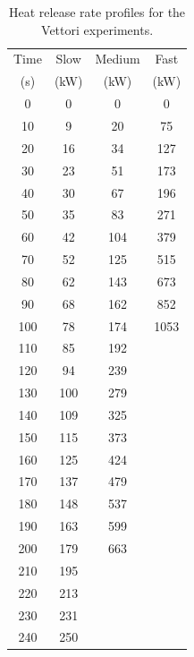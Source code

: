 \begin{table}[h!]
\caption[Heat release rate profiles for the Vettori experiments]{Heat release rate profiles for the Vettori experiments.}
\begin{center}
\begin{tabular}{|c|c|c|c|}
\hline
Time    & Slow     & Medium     & Fast   \\
(s)     & (kW)     & (kW)       & (kW)   \\  \hline \hline
0       & 0        & 0          & 0      \\ \hline 10		& 9        &  20        &  75    \\ \hline
20		& 16       &  34        &  127   \\ \hline
30		&   23     &  51        &  173   \\ \hline
40		&   30     &  67        &  196   \\ \hline
50		&   35     &  83        &  271   \\ \hline
60		&   42     &  104       &  379   \\ \hline
70		&   52     &  125       &  515   \\ \hline
80		&   62     &  143       &  673   \\ \hline
90		&   68     &  162       &  852   \\ \hline
100		&  78      &  174       & 1053   \\ \hline
110		&  85      &  192       &        \\ \hline
120		&  94      &  239       &        \\ \hline
130		&  100     &  279       &        \\ \hline
140		&  109     &  325       &        \\ \hline
150		&  115     &  373       &        \\ \hline
160		&  125     &  424       &        \\ \hline
170		&  137     &  479       &        \\ \hline
180		&  148     &  537       &        \\ \hline
190		&  163     &  599       &        \\ \hline
200		&  179     &  663       &        \\ \hline
210		&  195     &            &        \\ \hline
220		&  213     &            &        \\ \hline
230		&  231     &            &        \\ \hline
240		&  250     &            &        \\ \hline

\end{tabular}
\end{center}
\end{table}
